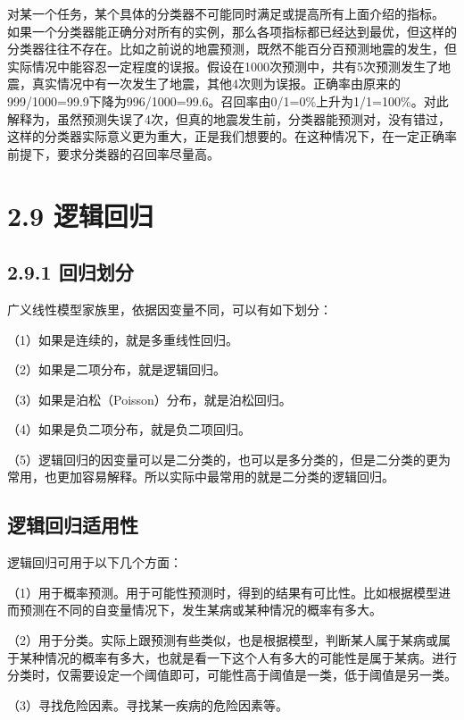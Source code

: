 ​ 对某一个任务，某个具体的分类器不可能同时满足或提高所有上面介绍的指标。
​
如果一个分类器能正确分对所有的实例，那么各项指标都已经达到最优，但这样的分类器往往不存在。比如之前说的地震预测，既然不能百分百预测地震的发生，但实际情况中能容忍一定程度的误报。假设在1000次预测中，共有5次预测发生了地震，真实情况中有一次发生了地震，其他4次则为误报。正确率由原来的999/1000=99.9下降为996/1000=99.6。召回率由0/1=0\%上升为1/1=100\%。对此解释为，虽然预测失误了4次，但真的地震发生前，分类器能预测对，没有错过，这样的分类器实际意义更为重大，正是我们想要的。在这种情况下，在一定正确率前提下，要求分类器的召回率尽量高。

\section{2.9 逻辑回归}\label{ux903bux8f91ux56deux5f52}

\subsection{2.9.1 回归划分}\label{ux56deux5f52ux5212ux5206}

广义线性模型家族里，依据因变量不同，可以有如下划分：

（1）如果是连续的，就是多重线性回归。

（2）如果是二项分布，就是逻辑回归。

（3）如果是泊松（Poisson）分布，就是泊松回归。

（4）如果是负二项分布，就是负二项回归。

（5）逻辑回归的因变量可以是二分类的，也可以是多分类的，但是二分类的更为常用，也更加容易解释。所以实际中最常用的就是二分类的逻辑回归。

\subsection{逻辑回归适用性}\label{ux903bux8f91ux56deux5f52ux9002ux7528ux6027}

逻辑回归可用于以下几个方面：

（1）用于概率预测。用于可能性预测时，得到的结果有可比性。比如根据模型进而预测在不同的自变量情况下，发生某病或某种情况的概率有多大。

（2）用于分类。实际上跟预测有些类似，也是根据模型，判断某人属于某病或属于某种情况的概率有多大，也就是看一下这个人有多大的可能性是属于某病。进行分类时，仅需要设定一个阈值即可，可能性高于阈值是一类，低于阈值是另一类。

（3）寻找危险因素。寻找某一疾病的危险因素等。


